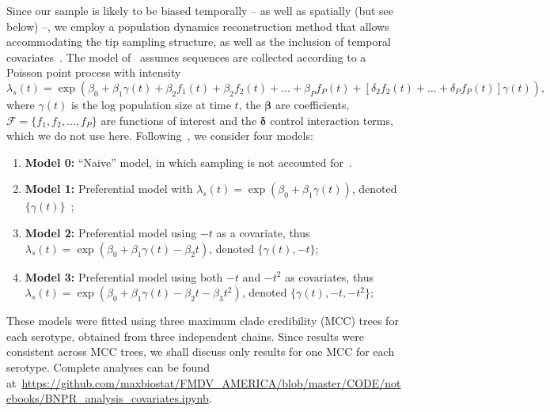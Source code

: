 \documentclass[a4paper,10pt]{article}
\begin{document}
Since our sample is likely to be biased temporally -- as well as spatially (but see below) --, we employ a population dynamics reconstruction method that allows accommodating the tip sampling structure, as well as the inclusion of temporal covariates~\citep{M-Karcher2020}.
The model of~\cite{M-Karcher2020} assumes sequences are collected according to a Poisson point process with intensity
\begin{equation}
 \label{eq:skytrack}
 \lambda_s(t) = \exp\left( \beta_0 + \beta_1\gamma(t) + \beta_2 f_1(t)  + \beta_2 f_2(t) + \ldots + \beta_P f_P(t) + \left[\delta_2 f_2(t) + \ldots + \delta_P f_P(t) \right]\gamma(t) \right),
\end{equation}
where $\gamma(t)$ is the log population size at time $t$, the $\boldsymbol\beta$ are coefficients, $\mathcal{F} = \{f_1, f_2, \ldots, f_P\}$ are functions of interest and the $\boldsymbol\delta$ control interaction terms, which we do not use here.
Following~\cite{M-Karcher2020}, we consider four models:
\begin{enumerate}
 \item \textbf{Model 0:} ``Naive'' model, in which sampling is not accounted for~\citep{Palacios2015}.
 \item \textbf{Model 1:} Preferential model with $\lambda_s(t) = \exp(\beta_0 + \beta_1\gamma(t))$, denoted $\{\gamma(t)\}$~\citep{M-Karcher2016};
 \item \textbf{Model 2:} Preferential model using $-t$ as a covariate, thus $\lambda_s(t) = \exp(\beta_0 + \beta_1\gamma(t) -\beta_2 t)$, denoted $\{\gamma(t), -t\}$;
 \item \textbf{Model 3:} Preferential model using both $-t$ and $-t^2$ as covariates, thus $\lambda_s(t) = \exp(\beta_0 + \beta_1\gamma(t) -\beta_2 t - \beta_3t^2)$, denoted $\{\gamma(t), -t, -t^2\}$;
\end{enumerate}

These models were fitted using three maximum clade credibility (MCC) trees for each serotype, obtained from three independent chains. %
Since results were consistent across MCC trees, we shall discuss only results for one MCC for each serotype.
Complete analyses can be found at~\url{https://github.com/maxbiostat/FMDV_AMERICA/blob/master/CODE/notebooks/BNPR_analysis_covariates.ipynb}.
\end{document}
